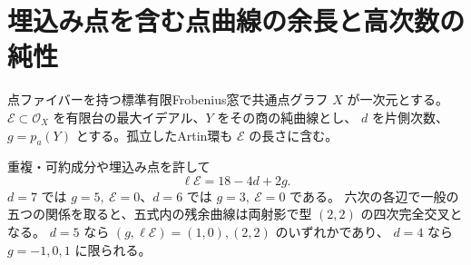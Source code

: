 \section{埋込み点を含む点曲線の余長と高次数の純性}
\label{sec:pure-curve-finite-defect}
点ファイバーを持つ標準有限Frobenius窓で共通点グラフ $X$ が一次元とする。
$\mathcal E\subset\mathcal O_X$ を有限台の最大イデアル、$Y$ をその商の純曲線とし、
$d$ を片側次数、$g=p_a(Y)$ とする。孤立したArtin環も $\mathcal E$ の長さに含む。
\begin{theorem}\label{thm:pure-curve-defect}
重複・可約成分や埋込み点を許して
\[
                    \ell\mathcal E=18-4d+2g .
\]
$d=7$ では $g=5,\ \mathcal E=0$、$d=6$ では $g=3,\ \mathcal E=0$ である。
六次の各辺で一般の五つの関係を取ると、五式内の残余曲線は両射影で型 $(2,2)$ の四次完全交叉となる。
$d=5$ なら $(g,\ell\mathcal E)=(1,0),(2,2)$ のいずれかであり、
$d=4$ なら $g=-1,0,1$ に限られる。
\end{theorem}
